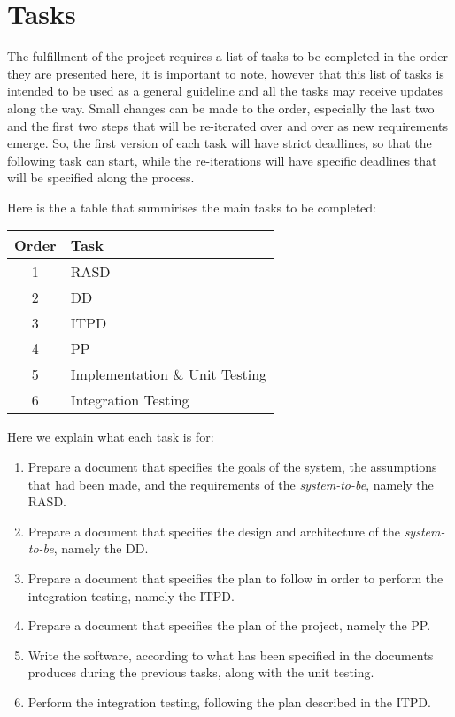 \section{Tasks} %
\label{sec:tasks}

The fulfillment of the project requires a list of tasks to be completed in the order they are presented here, it is important to note, however that this list of tasks is intended to be used as a general guideline and all the tasks may receive updates along the way.
Small changes can be made to the order, especially the last two and the first two steps that will be re-iterated over and over as new requirements emerge.
So, the first version of each task will have strict deadlines, so that the following task can start, while the re-iterations will have specific deadlines that will be specified along the process.

Here is the a table that summirises the main tasks to be completed:
\begin{center}
\begin{tabular}{ c|l }
	\textbf{Order} & \textbf{Task} \\ \hline
	1 & RASD \\ \hline
	2 & DD \\ \hline
	3 & ITPD \\ \hline
	4 & PP \\ \hline
	5 & Implementation \& Unit Testing \\ \hline
	6 & Integration Testing \\
\end{tabular}
\end{center}

Here we explain what each task is for:

\begin{enumerate}
	\item Prepare a document that specifies the goals of the system, the assumptions that had been made, and the requirements of the \emph{system-to-be}, namely the RASD.
	\item Prepare a document that specifies the design and architecture of the \emph{system-to-be}, namely the DD.
	\item Prepare a document that specifies the plan to follow in order to perform the integration testing, namely the ITPD.
	\item Prepare a document that specifies the plan of the project, namely the PP.
	\item Write the software, according to what has been specified in the documents produces during the previous tasks, along with the unit testing.
	\item Perform the integration testing, following the plan described in the ITPD.
\end{enumerate}

